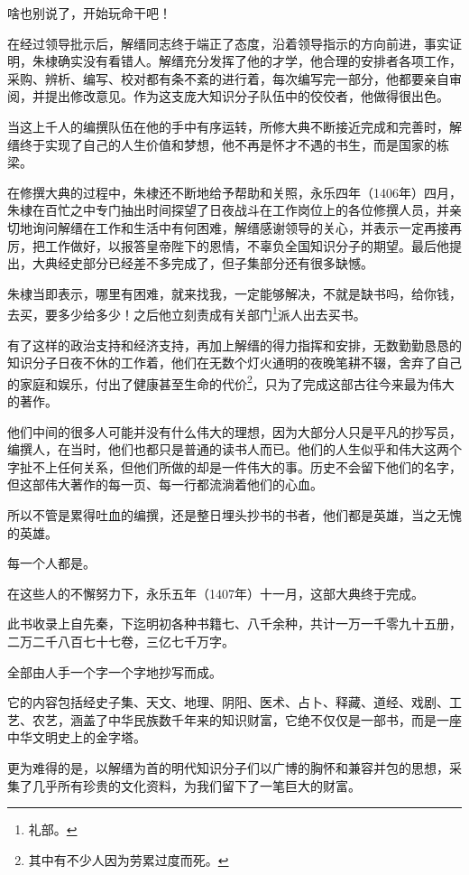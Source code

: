\begin{multicols}{\theparacolNo}
啥也别说了，开始玩命干吧！

在经过领导批示后，解缙同志终于端正了态度，沿着领导指示的方向前进，事实证明，朱棣确实没有看错人。解缙充分发挥了他的才学，他合理的安排者各项工作，采购、辨析、编写、校对都有条不紊的进行着，每次编写完一部分，他都要亲自审阅，并提出修改意见。作为这支庞大知识分子队伍中的佼佼者，他做得很出色。

当这上千人的编撰队伍在他的手中有序运转，所修大典不断接近完成和完善时，解缙终于实现了自己的人生价值和梦想，他不再是怀才不遇的书生，而是国家的栋梁。

在修撰大典的过程中，朱棣还不断地给予帮助和关照，永乐四年（1406年）四月，朱棣在百忙之中专门抽出时间探望了日夜战斗在工作岗位上的各位修撰人员，并亲切地询问解缙在工作和生活中有何困难，解缙感谢领导的关心，并表示一定再接再厉，把工作做好，以报答皇帝陛下的恩情，不辜负全国知识分子的期望。最后他提出，大典经史部分已经差不多完成了，但子集部分还有很多缺憾。

朱棣当即表示，哪里有困难，就来找我，一定能够解决，不就是缺书吗，给你钱，去买，要多少给多少！之后他立刻责成有关部门\footnote{礼部。}派人出去买书。

有了这样的政治支持和经济支持，再加上解缙的得力指挥和安排，无数勤勤恳恳的知识分子日夜不休的工作着，他们在无数个灯火通明的夜晚笔耕不辍，舍弃了自己的家庭和娱乐，付出了健康甚至生命的代价\footnote{其中有不少人因为劳累过度而死。}，只为了完成这部古往今来最为伟大的著作。

他们中间的很多人可能并没有什么伟大的理想，因为大部分人只是平凡的抄写员，编撰人，在当时，他们也都只是普通的读书人而已。他们的人生似乎和伟大这两个字扯不上任何关系，但他们所做的却是一件伟大的事。历史不会留下他们的名字，但这部伟大著作的每一页、每一行都流淌着他们的心血。

所以不管是累得吐血的编撰，还是整日埋头抄书的书者，他们都是英雄，当之无愧的英雄。

每一个人都是。

在这些人的不懈努力下，永乐五年（1407年）十一月，这部大典终于完成。

此书收录上自先秦，下迄明初各种书籍七、八千余种，共计一万一千零九十五册，二万二千八百七十七卷，三亿七千万字。

全部由人手一个字一个字地抄写而成。

它的内容包括经史子集、天文、地理、阴阳、医术、占卜、释藏、道经、戏剧、工艺、农艺，涵盖了中华民族数千年来的知识财富，它绝不仅仅是一部书，而是一座中华文明史上的金字塔。

更为难得的是，以解缙为首的明代知识分子们以广博的胸怀和兼容并包的思想，采集了几乎所有珍贵的文化资料，为我们留下了一笔巨大的财富。


\end{multicols}
